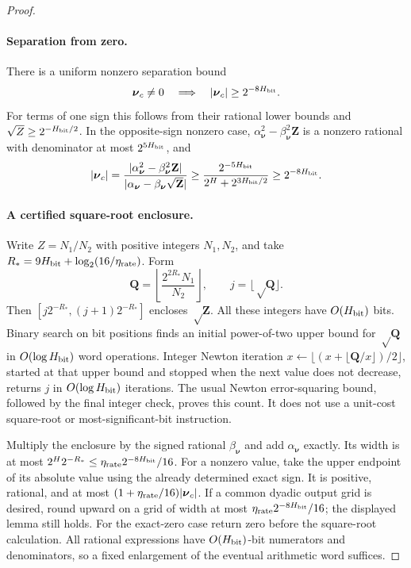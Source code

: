 \documentclass[11pt]{article}
\theoremstyle{remark}
\newcommand{\ZZ}{\mathbf Z}
\newcommand{\QQ}{\mathbf Q}
\newcommand{\nnu}{\boldsymbol{\nu}}
\begin{document}
\begin{proof}
\paragraph{Separation from zero.}
There is a uniform nonzero separation bound
\[
 \nnu_c\ne0\quad\Longrightarrow\quad |\nnu_c|\ge2^{-8H_{\rm bit}}.
\]
For terms of one sign this follows from their rational lower bounds and $\sqrt
Z\ge2^{-H_{\rm bit}/2}$.
In the opposite-sign nonzero case, $\alpha_{\nnu}^2-\beta_{\nnu}^2\ZZ$ is a nonzero rational with
denominator at most $2^{5H_{\rm bit}}$, and
\[
 |\nnu_c|
 =\frac{|\alpha_{\nnu}^2-\beta_{\nnu}^2\ZZ|}{|\alpha_{\nnu}-\beta_{\nnu}\sqrt\ZZ|}
 \ge\frac{2^{-5H_{\rm bit}}}{2^H+2^{3H_{\rm bit}/2}}
 \ge2^{-8H_{\rm bit}}.
\]

\paragraph{A certified square-root enclosure.}
Write $Z=N_1/N_2$ with positive integers $N_1,N_2$, and take
$R_*=9H_{\rm bit}+ \log_2(16/\eta_{\rm rate}) $.
Form
\[
 \QQ=\left\lfloor\frac{2^{2R_*}N_1}{N_2}\right\rfloor,
 \qquad j=\lfloor\sqrt \QQ\rfloor.
\]
Then $[j2^{-R_*},(j+1)2^{-R_*}]$ encloses $\sqrt\ZZ$.
All these integers have $O(H_{\rm bit})$ bits.
Binary search on bit positions finds an initial power-of-two upper bound for
$\sqrt \QQ$ in $O(\log H_{\rm bit})$ word operations.
Integer Newton iteration $x\leftarrow\lfloor(x+\lfloor \QQ/x\rfloor)/2\rfloor$,
started at that upper bound and stopped when the next value does not decrease,
returns $j$ in $O(\log H_{\rm bit})$ iterations.
The usual Newton error-squaring bound, followed by the final integer check,
proves this count.
It does not use a unit-cost square-root or most-significant-bit instruction.

Multiply the enclosure by the signed rational $\beta_{\nnu}$ and add $\alpha_{\nnu}$ exactly.
Its width is at most $2^H2^{-R_*}\le\eta_{\rm rate}2^{-8H_{\rm bit}}/16$.
For a nonzero value, take the upper endpoint of its absolute value using the
already determined exact sign.
It is positive, rational, and at most $(1+\eta_{\rm rate}/16)|\nnu_c|$.
If a common dyadic output grid is desired, round upward on a grid of width at
most $\eta_{\rm rate}2^{-8H_{\rm bit}}/16$; the displayed lemma still holds.
For the exact-zero case return zero before the square-root calculation.
All rational expressions have $O(H_{\rm bit})$-bit numerators and denominators, so a fixed
enlargement of the eventual arithmetic word suffices.
\end{proof}
\end{document}
